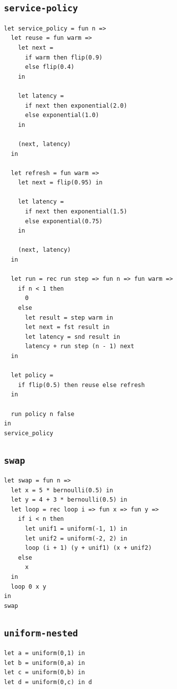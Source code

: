 \subsection{\texttt{service-policy}}

\begin{lstlisting}[breaklines=true]
let service_policy = fun n =>
  let reuse = fun warm =>
    let next =
      if warm then flip(0.9)
      else flip(0.4)
    in

    let latency =
      if next then exponential(2.0)
      else exponential(1.0)
    in

    (next, latency)
  in

  let refresh = fun warm =>
    let next = flip(0.95) in

    let latency =
      if next then exponential(1.5)
      else exponential(0.75)
    in

    (next, latency)
  in

  let run = rec run step => fun n => fun warm =>
    if n < 1 then
      0
    else
      let result = step warm in
      let next = fst result in
      let latency = snd result in
      latency + run step (n - 1) next
  in

  let policy =
    if flip(0.5) then reuse else refresh
  in

  run policy n false
in
service_policy
\end{lstlisting}

\subsection{\texttt{swap}}

\begin{lstlisting}[breaklines=true]
let swap = fun n =>
  let x = 5 * bernoulli(0.5) in
  let y = 4 + 3 * bernoulli(0.5) in
  let loop = rec loop i => fun x => fun y =>
    if i < n then
      let unif1 = uniform(-1, 1) in
      let unif2 = uniform(-2, 2) in
      loop (i + 1) (y + unif1) (x + unif2)
    else
      x
  in
  loop 0 x y
in
swap
\end{lstlisting}

\subsection{\texttt{uniform-nested}}

\begin{lstlisting}[breaklines=true]
let a = uniform(0,1) in
let b = uniform(0,a) in
let c = uniform(0,b) in
let d = uniform(0,c) in d
\end{lstlisting}

